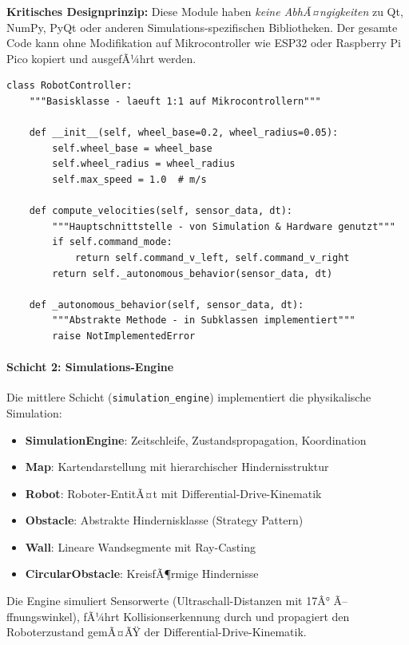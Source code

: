 ﻿\documentclass[a4paper,12pt]{article}
\theoremstyle{definition}
\begin{document}
\textbf{Kritisches Designprinzip:} Diese Module haben \emph{keine AbhÃ¤ngigkeiten} zu Qt, NumPy, PyQt oder anderen Simulations-spezifischen Bibliotheken. Der gesamte Code kann ohne Modifikation auf Mikrocontroller wie ESP32 oder Raspberry Pi Pico kopiert und ausgefÃ¼hrt werden.

\begin{lstlisting}[style=pythonstyle, caption={Abstrakte Basisklasse fÃ¼r maximale Wiederverwendbarkeit}]
class RobotController:
    """Basisklasse - laeuft 1:1 auf Mikrocontrollern"""
    
    def __init__(self, wheel_base=0.2, wheel_radius=0.05):
        self.wheel_base = wheel_base
        self.wheel_radius = wheel_radius
        self.max_speed = 1.0  # m/s
    
    def compute_velocities(self, sensor_data, dt):
        """Hauptschnittstelle - von Simulation & Hardware genutzt"""
        if self.command_mode:
            return self.command_v_left, self.command_v_right
        return self._autonomous_behavior(sensor_data, dt)
    
    def _autonomous_behavior(self, sensor_data, dt):
        """Abstrakte Methode - in Subklassen implementiert"""
        raise NotImplementedError
\end{lstlisting}

\paragraph{Schicht 2: Simulations-Engine}

Die mittlere Schicht (\texttt{simulation\_engine}) implementiert die physikalische Simulation:

\begin{itemize}
	\item \textbf{SimulationEngine}: Zeitschleife, Zustandspropagation, Koordination
	\item \textbf{Map}: Kartendarstellung mit hierarchischer Hindernisstruktur
	\item \textbf{Robot}: Roboter-EntitÃ¤t mit Differential-Drive-Kinematik
	\item \textbf{Obstacle}: Abstrakte Hindernisklasse (Strategy Pattern)
	\item \textbf{Wall}: Lineare Wandsegmente mit Ray-Casting
	\item \textbf{CircularObstacle}: KreisfÃ¶rmige Hindernisse
\end{itemize}

Die Engine simuliert Sensorwerte (Ultraschall-Distanzen mit 17Â° Ã–ffnungswinkel), fÃ¼hrt Kollisionserkennung durch und propagiert den Roboterzustand gemÃ¤ÃŸ der Differential-Drive-Kinematik.
\end{document}
